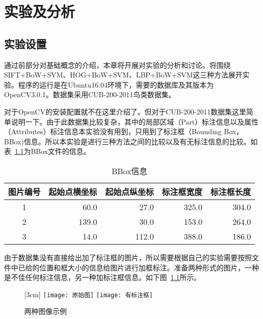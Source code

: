 \chapter{实验及分析}
\label{cha:shiyanfenxi}

\section{实验设置}
\label{sec:shiyanzhunbei}
通过前部分对基础概念的介绍，本章将开展对实验的分析和讨论。将围绕SIFT+BoW+SVM、HOG+BoW+SVM、LBP+BoW+SVM这三种方法展开实验。程序的运行是在Ubuntu16.04环境下，需要的数据库及其版本为OpenCV3.0.1。数据集采用CUB-200-2011鸟类数据集。

对于OpenCV的安装配置就不在这里介绍了。但对于CUB-200-2011数据集这里简单说明一下。由于此数据集比较复杂，其中的局部区域（Part）标注信息以及属性（Attributes）标注信息本实验没有用到，只用到了标注框（Bounding Box，BBox)信息。所以本实验是进行三种方法之间的比较以及有无标注信息的比较。如表~\ref{tab:BBox}为BBox文件的信息。
\begin{table}[htb]
  \caption{BBox信息}
  \label{tab:BBox}
   \begin{tabularx}{\linewidth}{c|rrrr}
     \toprule[1.5pt]
      图片编号 & 起始点横坐标 &  起始点纵坐标 &  标注框宽度 &  标注框长度 \\
     \hline
      1 & 60.0 & 27.0 & 325.0 & 304.0\\
      2 & 139.0 & 30.0 & 153.0 & 264.0\\
      3 & 14.0 & 112.0 & 388.0 & 186.0\\
      \bottomrule[1.5pt]
    \end{tabularx}
\end{table}

由于数据集没有直接给出加了标注框的图片，所以需要根据自己的实验需要按照文件中已给的位置和框大小的信息给图片进行加框标注。准备两种形式的图片，一种是不佳任何标注信息，另一种加标注框信息。如下图~\ref{fig:shiliyuanshibiaozhu}所示。
\begin{figure}[H]
  \centering%
  [3cm] %
    {\texttt{[image: 原始图]}}%
  \qquad \qquad \qquad \qquad
      {\texttt{[image: 有标注框]}}
  \caption{两种图像示例}
  \label{fig:shiliyuanshibiaozhu}
\end{figure}

